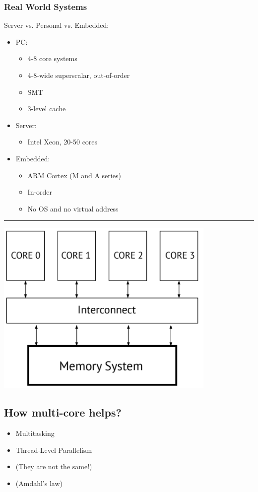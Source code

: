 \documentclass[10pt]{article}
\begin{document}
\subsubsection*{Real World Systems}
Server vs. Personal vs. Embedded:
\begin{itemize}
    \item PC:
    \begin{itemize}
        \item 4-8 core systems
        \item 4-8-wide superscalar, out-of-order
        \item SMT
        \item 3-level cache
    \end{itemize}
    \item Server:
    \begin{itemize}
        \item Intel Xeon, 20-50 cores
    \end{itemize}
    \item Embedded:
    \begin{itemize}
        \item ARM Cortex (M and A series)
        \item In-order
        \item No OS and no virtual address
    \end{itemize}
\end{itemize}
\rule{\textwidth}{2pt}
\begin{center}
    \includegraphics*[scale=0.7]{W8_4.png}
\end{center}

\subsection*{How multi-core helps?}
\begin{itemize}
    \item Multitasking
    \item Thread-Level Parallelism
    \item (They are not the same!)
    \item (Amdahl's law)
\end{itemize}
\end{document}

